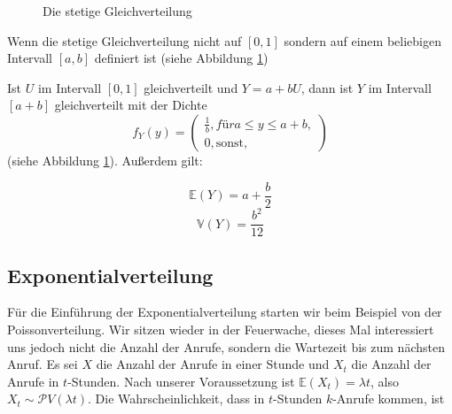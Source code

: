 {    {
        \begin{figure}
            \subfigure[Dichtefunktion]{
                \begin{tikzpicture}
                    
                \end{tikzpicture}
                \label{fig:gleichverteilung_stetig_a}
            }
            \subfigure[Verteilungsfunktion]{
                \begin{tikzpicture}
                    
                \end{tikzpicture}
                \label{fig:gleichverteilung_stetig_b}
            }
           \caption{Die stetige Gleichverteilung}
           \label{fig:gleichverteilung_stetig}
        \end{figure}
    }

    Wenn die stetige Gleichverteilung nicht auf $[0,1]$ sondern auf einem
    beliebigen Intervall $[a, b]$ definiert ist (siehe Abbildung \ref{fig:gleichverteilung_stetig})

    \begin{definition}
    Ist $U$ im Intervall $[0,1]$ gleichverteilt und $Y=a+bU$, dann ist $Y$ im Intervall
    $[a+b]$ gleichverteilt mit der Dichte
    \[
    f_{Y}\left(y\right)=\left(\begin{matrix}\frac{1}{b},f\text{ü}ra\le
    y\le a+b,\\0,\text{s}\text{o}\text{n}\text{s}\text{t}\text{,}\end{matrix}\right)
    \] (siehe Abbildung \ref{fig:gleichverteilung_stetig}). Außerdem gilt:

    \[\mathbb E\left(Y\right)=a+\frac{b}{2}\]
    \[\mathbb V\left(Y\right)=\frac{b^{2}}{12}\]
    \end{definition}

    \subsection{Exponentialverteilung}

    Für die Einführung der Exponentialverteilung starten wir beim Beispiel
    von der Poissonverteilung. Wir sitzen wieder in der Feuerwache, dieses
    Mal interessiert uns jedoch nicht die Anzahl der Anrufe, sondern die
    Wartezeit bis zum nächsten Anruf. Es sei $X$ die Anzahl der Anrufe in
    einer Stunde und $X_{t}$ die Anzahl der Anrufe in $t$-Stunden. 
    Nach unserer Voraussetzung ist $\mathbb E\left(X_{t}\right)=\lambda t$, 
    also $X_{t}\sim \mathcal PV\left(\lambda t\right)$. 
    Die Wahrscheinlichkeit, dass in $t$-Stunden $k$-Anrufe kommen, ist

}
